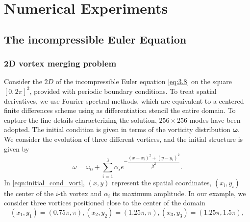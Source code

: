

\section{Numerical Experiments} \label{sec:res}

\subsection{The incompressible Euler Equation}
\subsubsection{2D vortex merging problem}
Consider the $2D$ of the incompressible Euler equation \eqref{eq:3.8} on the square $[0,2\pi]^2$, provided with periodic boundary conditions. To treat spatial derivatives, we use Fourier spectral methods, which are equivalent to a centered finite differences scheme using as differentiation stencil the entire domain. To capture the fine details characterizing the solution, $256\times 256$ modes have been adopted. The initial condition is given in terms of the vorticity distribution $\mathbf{\omega}$. We consider the evolution of three different vortices, and the initial structure is given by
\begin{equation}\label{eqn:initial_cond_vort}
\omega = \omega_0 + \sum_{i=1}^{3} \alpha_i e^{-\dfrac{\left(x-x_i\right)^{2}+\left(y-y_i\right)^{2}}{\beta^2}}.
\end{equation}
In \eqref{eqn:initial_cond_vort}, $(x,y)$ represent the spatial coordinates, $\left( x_i, y_i\right)$ the center of the $i$-th vortex and $\alpha_i$ its maximum amplitude. In our example, we consider three vortices positioned close to the center of the domain 
\begin{equation}
\left( x_1, y_1 \right) = \left(0.75\pi,\pi\right) , \left( x_2, y_2 \right) = \left(1.25\pi,\pi\right), \left( x_3, y_3 \right) = \left(1.25\pi,1.5\pi\right),
\end{equation}
